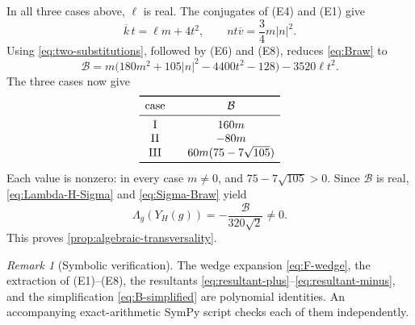 \documentclass[11pt,reqno]{amsart}
\theoremstyle{definition}
\theoremstyle{remark}
\newtheorem{remark}[theorem]{Remark}
\newcommand{\abs}[1]{\left\lvert #1\right\rvert}
\begin{document}
In all three cases above, $\ell$ is real.  The conjugates of (E4) and (E1)
give
\begin{equation}\label{eq:two-substitutions}
\overline k\,t=\ell m+4t^2,
\qquad
nt\overline v=\frac34m\abs n^2.
\end{equation}
Using \eqref{eq:two-substitutions}, followed by (E6) and (E8), reduces
\eqref{eq:Braw} to
\begin{equation}\label{eq:B-simplified}
\mathcal B
=m\bigl(180m^2+105\abs n^2-4400t^2-128\bigr)
-3520\ell t^2.
\end{equation}
The three cases now give
\begin{equation}\label{eq:B-values}
\begin{array}{c@{\qquad}c}
\toprule
\text{case}&\mathcal B\\
\midrule
\mathrm{I}&160m\\
\mathrm{II}&-80m\\
\mathrm{III}&60m(75-7\sqrt{105})\\
\bottomrule
\end{array}
\end{equation}
Each value is nonzero: in every case $m\ne0$, and
$75-7\sqrt{105}>0$.  Since $\mathcal B$ is real,
\eqref{eq:Lambda-H-Sigma} and \eqref{eq:Sigma-Braw} yield
\[
\Lambda_g(Y_H(g))=-\frac{\mathcal B}{320\sqrt2}\ne0.
\]
This proves \cref{prop:algebraic-transversality}.

\begin{remark}[Symbolic verification]
The wedge expansion \eqref{eq:F-wedge}, the extraction of (E1)--(E8), the
resultants \eqref{eq:resultant-plus}--\eqref{eq:resultant-minus}, and the
simplification \eqref{eq:B-simplified} are polynomial identities.  An
accompanying exact-arithmetic SymPy script checks each of them independently.
\end{remark}
\end{document}

